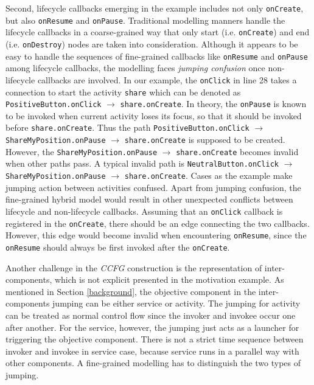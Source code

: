 Second, lifecycle callbacks emerging in the example includes not only \texttt{onCreate}, but also
\texttt{onResume} and \texttt{onPause}. Traditional modelling manners handle the lifecycle callbacks in a coarse-grained way that only start (i.e. \texttt{onCreate}) and end (i.e. \texttt{onDestroy}) nodes are taken into consideration. Although it appears to be easy to handle the sequences of fine-grained callbacks like \texttt{onResume} and \texttt{onPause} among lifecycle callbacks, the modelling faces \textit{jumping confusion} once non-lifecycle callbacks are involved. In our example, the \texttt{onClick} in line 28 takes a connection to start the activity \texttt{share} which can be denoted as \texttt{PositiveButton.onClick} $\rightarrow$ \texttt{share.onCreate}. In theory, the \texttt{onPause} is known to be invoked when current activity loses its focus, so that it should be invoked before \texttt{share.onCreate}. Thus the path \texttt{PositiveButton.onClick} $\rightarrow$ \texttt{ShareMyPosition.onPause} $\rightarrow$ \texttt{share.onCreate} is supposed to be created. However, the \texttt{ShareMyPosition.onPause} $\rightarrow$ \texttt{share.onCreate} becomes invalid when other paths pass. A typical invalid path is \texttt{NeutralButton.onClick} $\rightarrow$ \texttt{ShareMyPosition.onPause} $\rightarrow$ \texttt{share.onCreate}. Cases as the example make jumping action between activities confused. Apart from jumping confusion, the fine-grained hybrid model would result in other unexpected conflicts between lifecycle and non-lifecycle callbacks. Assuming that an \texttt{onClick} callback is registered in the \texttt{onCreate}, there should be an edge connecting the two callbacks. However, this edge would become invalid when encountering \texttt{onResume}, since the \texttt{onResume} should always be first invoked after the \texttt{onCreate}.

Another challenge in the \textit{CCFG} construction is the representation of inter-components, which is not explicit presented in the motivation example. As mentioned in Section \ref{background}, the objective component in the inter-components jumping can be either service or activity. The jumping for activity can be treated as normal control flow since the invoker and invokee occur one after another. For the service, however, the jumping just acts as a launcher for triggering the objective component. There is not a strict time sequence between invoker and invokee in service case, because service runs in a parallel way with other components. A fine-grained modelling has to distinguish the two types of jumping.

